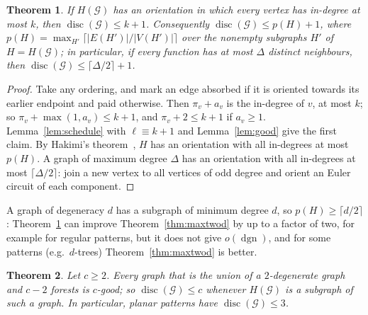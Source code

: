 \documentclass[11pt,letterpaper]{article}
\newtheorem{theorem}{Theorem}[section]
\theoremstyle{definition}
\newcommand{\cG}{\mathcal{G}}
\DeclareMathOperator{\disc}{disc}
\begin{document}
\begin{theorem}\label{thm:orient}
If $H(\cG)$ has an orientation in which every vertex has in-degree at most $k$, then
$\disc(\cG)\le k+1$. Consequently $\disc(\cG)\le p(H)+1$, where
$p(H)=\max_{H'}\lceil|E(H')|/|V(H')|\rceil$ over the nonempty subgraphs $H'$ of $H=H(\cG)$; in
particular, if every function has at most $\Delta$ distinct neighbours, then
$\disc(\cG)\le\lceil\Delta/2\rceil+1$.
\end{theorem}

\begin{proof}
Take any ordering, and mark an edge absorbed if it is oriented towards its earlier endpoint and paid
otherwise. Then $\pi_v+a_v$ is the in-degree of $v$, at most $k$; so $\pi_v+\max(1,a_v)\le k+1$, and
$\pi_v+2\le k+1$ if $a_v\ge1$. Lemma~\ref{lem:schedule} with $\ell\equiv k+1$ and Lemma~\ref{lem:good} give
the first claim. By Hakimi's theorem~\cite{Hak65}, $H$ has an orientation with all in-degrees at most
$p(H)$. A
graph of maximum degree $\Delta$ has an orientation with all in-degrees at most $\lceil\Delta/2\rceil$:
join a new vertex to all vertices of odd degree and orient an Euler circuit of each component.
\end{proof}

A graph of degeneracy $d$ has a subgraph of minimum degree $d$, so $p(H)\ge\lceil d/2\rceil$:
Theorem~\ref{thm:orient} can improve Theorem~\ref{thm:maxtwod} by up to a factor of two, for example for
regular patterns, but it does not give $o(\operatorname{dgn})$, and for some patterns (e.g.\ $d$-trees)
Theorem~\ref{thm:maxtwod} is better.

\begin{theorem}\label{thm:degforest}
Let $c\ge2$. Every graph that is the union of a $2$-degenerate graph and $c-2$ forests is $c$-good;
so $\disc(\cG)\le c$ whenever $H(\cG)$ is a subgraph of such a graph. In particular, planar patterns
have $\disc(\cG)\le3$.
\end{theorem}
\end{document}
